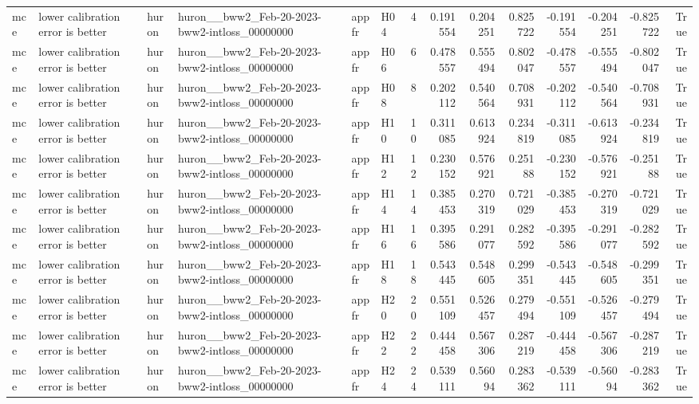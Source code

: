 \begin{longtable}{llllllrrrrrrrr}
mce & lower calibration error is better & huron & huron\_\_bww2\_Feb-20-2023-bww2-intloss\_00000000 & appfr & H04 & 4 & 0.191554 & 0.204251 & 0.825722 & -0.191554 & -0.204251 & -0.825722 & True \\
mce & lower calibration error is better & huron & huron\_\_bww2\_Feb-20-2023-bww2-intloss\_00000000 & appfr & H06 & 6 & 0.478557 & 0.555494 & 0.802047 & -0.478557 & -0.555494 & -0.802047 & True \\
mce & lower calibration error is better & huron & huron\_\_bww2\_Feb-20-2023-bww2-intloss\_00000000 & appfr & H08 & 8 & 0.202112 & 0.540564 & 0.708931 & -0.202112 & -0.540564 & -0.708931 & True \\
mce & lower calibration error is better & huron & huron\_\_bww2\_Feb-20-2023-bww2-intloss\_00000000 & appfr & H10 & 10 & 0.311085 & 0.613924 & 0.234819 & -0.311085 & -0.613924 & -0.234819 & True \\
mce & lower calibration error is better & huron & huron\_\_bww2\_Feb-20-2023-bww2-intloss\_00000000 & appfr & H12 & 12 & 0.230152 & 0.576921 & 0.25188 & -0.230152 & -0.576921 & -0.25188 & True \\
mce & lower calibration error is better & huron & huron\_\_bww2\_Feb-20-2023-bww2-intloss\_00000000 & appfr & H14 & 14 & 0.385453 & 0.270319 & 0.721029 & -0.385453 & -0.270319 & -0.721029 & True \\
mce & lower calibration error is better & huron & huron\_\_bww2\_Feb-20-2023-bww2-intloss\_00000000 & appfr & H16 & 16 & 0.395586 & 0.291077 & 0.282592 & -0.395586 & -0.291077 & -0.282592 & True \\
mce & lower calibration error is better & huron & huron\_\_bww2\_Feb-20-2023-bww2-intloss\_00000000 & appfr & H18 & 18 & 0.543445 & 0.548605 & 0.299351 & -0.543445 & -0.548605 & -0.299351 & True \\
mce & lower calibration error is better & huron & huron\_\_bww2\_Feb-20-2023-bww2-intloss\_00000000 & appfr & H20 & 20 & 0.551109 & 0.526457 & 0.279494 & -0.551109 & -0.526457 & -0.279494 & True \\
mce & lower calibration error is better & huron & huron\_\_bww2\_Feb-20-2023-bww2-intloss\_00000000 & appfr & H22 & 22 & 0.444458 & 0.567306 & 0.287219 & -0.444458 & -0.567306 & -0.287219 & True \\
mce & lower calibration error is better & huron & huron\_\_bww2\_Feb-20-2023-bww2-intloss\_00000000 & appfr & H24 & 24 & 0.539111 & 0.56094 & 0.283362 & -0.539111 & -0.56094 & -0.283362 & True \\

\end{longtable}

